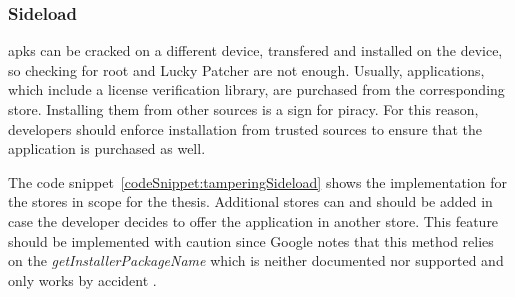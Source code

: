 \subsubsection{Sideload} \label{subsection:counter-improve-tampering-sideload}
\gls{apk}s can be cracked on a different device, transfered and installed on the device, so checking for root and Lucky Patcher are not enough.
Usually, applications, which include a license verification library, are purchased from the corresponding store.
Installing them from other sources is a sign for piracy.
For this reason, developers should enforce installation from trusted sources to ensure that the application is purchased as well.
\newline

The code snippet~\ref{codeSnippet:tamperingSideload} shows the implementation for the stores in scope for the thesis.
Additional stores can and should be added in case the developer decides to offer the application in another store.
\newline
This feature should be implemented with caution since Google notes that this method relies on the \textit{getInstallerPackageName} which is neither documented nor supported and only works by accident \cite{developersSecuring}.
